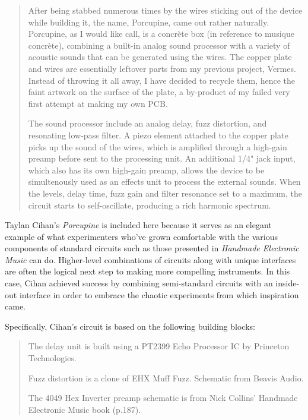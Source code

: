\begin{quote}
	
	After being stabbed numerous times by the wires sticking out of the device while building it, the name, Porcupine, came out rather naturally. Porcupine, as I would like call, is a concrète box (in reference to musique concrète), combining a built-in analog sound processor with a variety of acoustic sounds that can be generated using the wires. The copper plate and wires are essentially leftover parts from my previous project, Vermes. Instead of throwing it all away, I have decided to recycle them, hence the faint artwork on the surface of the plate, a by-product of my failed very first attempt at making my own PCB.

	The sound processor include an analog delay, fuzz distortion, and resonating low-pass filter. A piezo element attached to the copper plate picks up the sound of the wires, which is amplified through a high-gain preamp before sent to the processing unit. An additional 1/4" jack input, which also has its own high-gain preamp, allows the device to be simultenously used as an effects unit to process the external sounds. When the levels, delay time, fuzz gain and filter resonance set to a maximum, the circuit starts to self-oscillate, producing a rich harmonic spectrum.
	
	\end{quote}
	
	\citep{cihan2015}
	

Taylan Cihan's \textit{Porcupine} is included here because it serves as an elegant example of what experimenters who've grown comfortable with the various components of standard circuits such as those presented in \emph{Handmade Electronic Music} can do. Higher-level combinations of circuits along with unique interfaces are often the logical next step to making more compelling instruments. In this case, Cihan achieved success by combining semi-standard circuits with an inside-out interface in order to embrace the chaotic experiments from which inspiration came. 

Specifically, Cihan's circuit is based on the following building blocks: 
	
\begin{quote}
		
The delay unit is built using a PT2399 Echo Processor IC by Princeton Technologies.

Fuzz distortion is a clone of EHX Muff Fuzz. Schematic from Beavis Audio.

The 4049 Hex Inverter preamp schematic is from Nick Collins' Handmade Electronic Music book (p.187).
	
	\end{quote}

